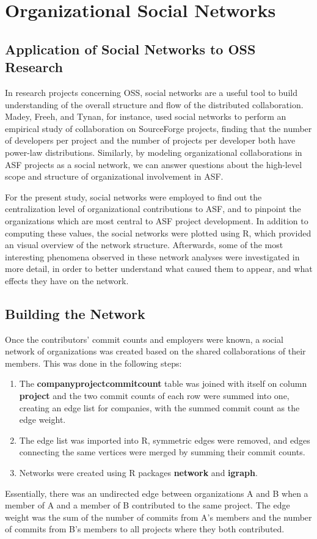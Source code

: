 \chapter{Organizational Social Networks}
\section{Application of Social Networks to OSS Research}
In research projects concerning OSS, social networks are a useful tool to build understanding of the overall structure and flow of the distributed collaboration. Madey, Freeh, and Tynan\cite{madey2002open}, for instance, used social networks to perform an empirical study of collaboration on SourceForge projects, finding that the number of developers per project and the number of projects per developer both have power-law distributions. Similarly, by modeling organizational collaborations in ASF projects as a social network, we can answer questions about the high-level scope and structure of organizational involvement in ASF.

For the present study, social networks were employed to find out the centralization level of organizational contributions to ASF, and to pinpoint the organizations which are most central to ASF project development. In addition to computing these values, the social networks were plotted using R, which provided an visual overview of the network structure. Afterwards, some of the most interesting phenomena observed in these network analyses were investigated in more detail, in order to better understand what caused them to appear, and what effects they have on the network.
\section{Building the Network}
Once the contributors' commit counts and employers were known, a social network of organizations was created based on the shared collaborations of their members. This was done in the following steps:
\begin{enumerate}
	\item The \textbf{companyprojectcommitcount} table was joined with itself on column \textbf{project} and the two commit counts of each row were summed into one, creating an edge list for companies, with the summed commit count as the edge weight.
	\item The edge list was imported into R, symmetric edges were removed, and edges connecting the same vertices were merged by summing their commit counts.  
	\item Networks were created using R packages \textbf{network} and \textbf{igraph}.
\end{enumerate}
Essentially, there was an undirected edge between organizations A and B when a member of A and a member of B contributed to the same project. The edge weight was the sum of the number of commits from A's members and the number of commits from B's members to all projects where they both contributed.

